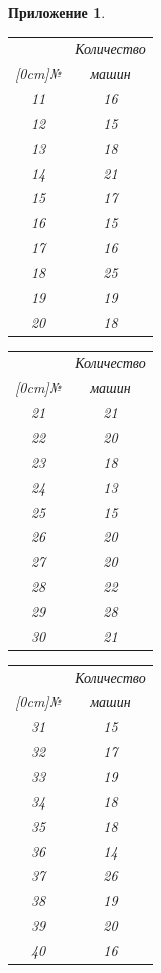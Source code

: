 \documentclass[12pt, a4paper]{extarticle}
\numberwithin{equation}{section}
\newtheorem{attachment}{\hspace{12cm}  Приложение}
\numberwithin{figure}{section}
\begin{document}
\begin{attachment}
\begin{table}[h!]
\begin{minipage}{0.23\linewidth}
		\begin{tabular}{|c|c|}
			\hline
			& Количество \\ 
			\raisebox{1.5ex}[0cm]{№}
			& машин  
			\\\hline
			11 & 16
			\\\hline
			12 & 15
			\\\hline
			13 & 18
			\\\hline
			14 & 21
			\\\hline
			15 & 17
			\\\hline
			16 & 15
			\\\hline
			17 & 16
			\\\hline
			18 & 25
			\\\hline
			19 & 19
			\\\hline
			20 & 18
			\\\hline
		\end{tabular}
	\end{minipage} 
	\begin{minipage}{0.23\linewidth}
		\centering
	
		\begin{tabular}{|c|c|}
			\hline
			& Количество \\ 
			\raisebox{1.5ex}[0cm]{№}
			& машин 
			\\\hline
			21 & 21
			\\\hline
			22 & 20
			\\\hline
			23 & 18
			\\\hline
			24 & 13
			\\\hline
			25 & 15
			\\\hline
			26 & 20
			\\\hline
			27 & 20
			\\\hline
			28 & 22
			\\\hline
			29 & 28
			\\\hline
			30 & 21
			\\\hline
		\end{tabular}
	\end{minipage} 
	\begin{minipage}{0.23\linewidth}
		\centering
	
		\begin{tabular}{|c|c|}
			\hline
			& Количество \\ 
			\raisebox{1.5ex}[0cm]{№}
			& машин 
			\\\hline
			31 & 15
			\\\hline
			32 & 17
			\\\hline
			33 & 19
			\\\hline
			34 & 18
			\\\hline
			35 & 18
			\\\hline
			36 & 14
			\\\hline
			37 & 26
			\\\hline
			38 & 19
			\\\hline
			39 & 20
			\\\hline
			40 & 16
			\\\hline
		\end{tabular}
	\end{minipage}
\end{table}


\end{attachment}
\end{document}
